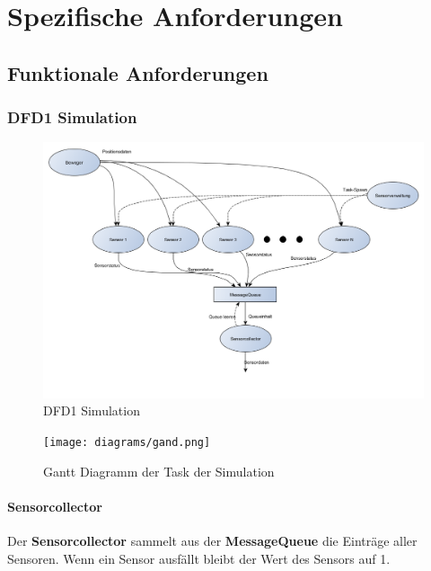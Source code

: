 \section{Spezifische Anforderungen}
\subsection{Funktionale Anforderungen}
\subsubsection{DFD1 Simulation}
\begin{figure}[H]
	\centering
  \includegraphics[width=\textwidth]{DFD/dfd1_simulation1_1.png}
	\caption{DFD1 Simulation}
	\label{fig1}
\end{figure}
\begin{figure}[H]
	\centering
  \texttt{[image: diagrams/gand.png]}
	\caption{Gantt Diagramm der Task der Simulation}
	\label{gantt}
\end{figure}
\paragraph{Sensorcollector}
Der \textbf{Sensorcollector} sammelt aus der \textbf{MessageQueue} die Einträge aller Sensoren. Wenn ein Sensor ausfällt bleibt der Wert des Sensors auf 1.